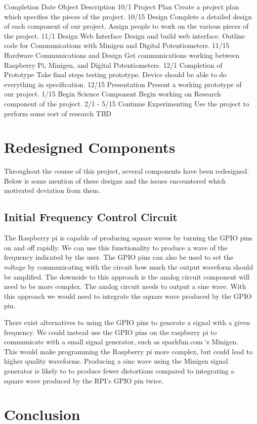 \documentclass{article}	%
\begin{document}
\begin{multicols}{2}
Completion Date
Object
Description
10/1
Project Plan
Create a project plan which specifies the pieces of the project.
10/15
Design
Complete a detailed design of each component of our project. Assign people to work on the various pieces of the project.
11/1
Design Web Interface
Design and build web interface. Outline code for Communications with Minigen and Digital Potentiometers.
11/15
Hardware Communications and Design
Get communications working between Raspberry Pi, Minigen, and Digital Potentiometers.
12/1
Completion of Prototype
Take final steps testing prototype. Device should be able to do everything in specification.
12/15
Presentation
Present a working prototype of our project.
1/15
Begin Science Component
Begin working on Research component of the project.
2/1 - 5/15
Continue Experimenting
Use the project to perform some sort of research TBD

\section{Redesigned Components}
Throughout the course of this project,
several components have been redesigned.
Below is some mention of these designs and
the issues encountered which motivated deviation from them.

\subsection{Initial Frequency Control Circuit}
The Raspberry pi is capable of producing square waves by turning the GPIO pins on and off rapidly. We can use this functionality to produce a wave of the frequency indicated by the user. The GPIO pins can also be used to set the voltage by communicating with the circuit how much the output waveform should be amplified. The downside to this approach is the analog circuit component will need to be more complex. The analog circuit needs to output a sine wave. With this approach we would need to integrate the square wave produced by the GPIO pin.

There exist alternatives to using the GPIO pins to generate a signal with a given frequency. We could instead use the GPIO pins on the raspberry pi to communicate with a small signal generator, such as sparkfun.com ‘s Minigen. This would make programming the Raspberry pi more complex, but could lead to higher quality waveforms. Producing a sine wave using the Minigen signal generator is likely to to produce fewer distortions compared to integrating a square wave produced by the RPI’s GPIO pin twice. 

\section{Conclusion}

\end{multicols}
\end{document}
